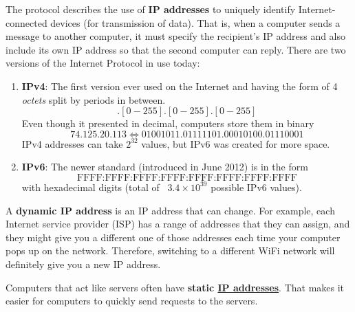 \documentclass{article}
\newcounter{definition}[section]
\newcounter{example}[section]
\begin{document}
  \begin{definition}[IP Addresses]
    \label{def:ip-addresses}
  The protocol describes the use of \textbf{IP addresses} to uniquely identify Internet-connected devices (for transmission of data). That is, when a computer sends a message to another computer, it must specify the recipient's IP address and also include its own IP address so that the second computer can reply. There are two versions of the Internet Protocol in use today: 
  \begin{enumerate}
      \item \textbf{IPv4}: The first version ever used on the Internet and having the form of 4 \textit{octets} split by periods in between. 
      \begin{equation}
        [0-255].[0-255].[0-255].[0-255]
      \end{equation}
      Even though it presented in decimal, computers store them in binary 
      \begin{equation}
        74.125.20.113 \iff 01001011.01111101.00010100.01110001
      \end{equation}
      IPv4 addresses can take $2^{32}$ values, but IPv6 was created for more space.
      \item \textbf{IPv6}: The newer standard (introduced in June 2012) is in the form 
      \begin{equation}
        \text{FFFF:FFFF:FFFF:FFFF:FFFF:FFFF:FFFF:FFFF}
      \end{equation}
      with hexadecimal digits (total of ~$3.4 \times 10^{39}$ possible IPv6 values). 
  \end{enumerate}
  \end{definition}

  \begin{definition}
    \label{def:dynamic-ip-address}
  A \textbf{dynamic IP address} is an IP address that can change. For example, each Internet service provider (ISP) has a range of addresses that they can assign, and they might give you a different one of those addresses each time your computer pops up on the network. Therefore, switching to a different WiFi network will definitely give you a new IP address. 

  Computers that act like servers often have \textbf{static \hyperref[def:ip-addresses]{IP addresses}}. That makes it easier for computers to quickly send requests to the servers. 
  \end{definition}
\end{document}
